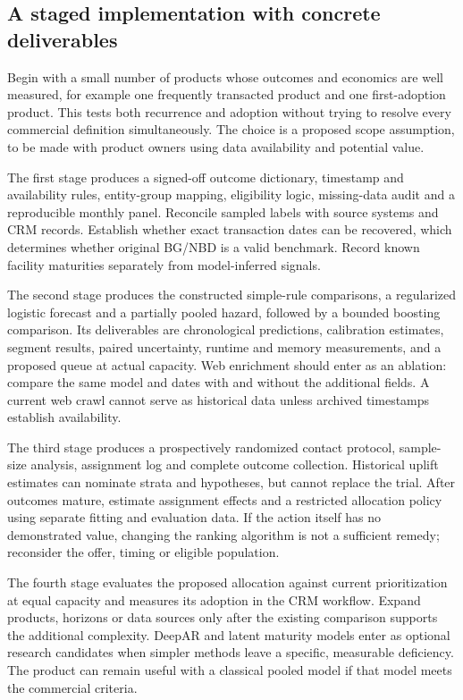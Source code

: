 \subsection{A staged implementation with concrete deliverables}

Begin with a small number of products whose outcomes and economics are well measured, for example one frequently transacted product and one first-adoption product. This tests both recurrence and adoption without trying to resolve every commercial definition simultaneously. The choice is a proposed scope assumption, to be made with product owners using data availability and potential value.

The first stage produces a signed-off outcome dictionary, timestamp and availability rules, entity-group mapping, eligibility logic, missing-data audit and a reproducible monthly panel. Reconcile sampled labels with source systems and CRM records. Establish whether exact transaction dates can be recovered, which determines whether original BG/NBD is a valid benchmark. Record known facility maturities separately from model-inferred signals.

The second stage produces the constructed simple-rule comparisons, a regularized logistic forecast and a partially pooled hazard, followed by a bounded boosting comparison. Its deliverables are chronological predictions, calibration estimates, segment results, paired uncertainty, runtime and memory measurements, and a proposed queue at actual capacity. Web enrichment should enter as an ablation: compare the same model and dates with and without the additional fields. A current web crawl cannot serve as historical data unless archived timestamps establish availability.

The third stage produces a prospectively randomized contact protocol, sample-size analysis, assignment log and complete outcome collection. Historical uplift estimates can nominate strata and hypotheses, but cannot replace the trial. After outcomes mature, estimate assignment effects and a restricted allocation policy using separate fitting and evaluation data. If the action itself has no demonstrated value, changing the ranking algorithm is not a sufficient remedy; reconsider the offer, timing or eligible population.

The fourth stage evaluates the proposed allocation against current prioritization at equal capacity and measures its adoption in the CRM workflow. Expand products, horizons or data sources only after the existing comparison supports the additional complexity. DeepAR and latent maturity models enter as optional research candidates when simpler methods leave a specific, measurable deficiency. The product can remain useful with a classical pooled model if that model meets the commercial criteria.

